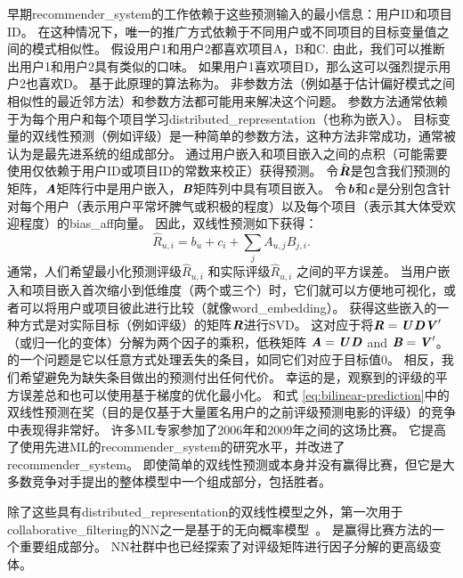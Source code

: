 早期\gls{recommender_system}的工作依赖于这些预测输入的最小信息：用户ID和项目ID。
在这种情况下，唯一的推广方式依赖于不同用户或不同项目的目标变量值之间的模式相似性。
假设用户1和用户2都喜欢项目A，B和C.
由此，我们可以推断出用户1和用户2具有类似的口味。
如果用户1喜欢项目D，那么这可以强烈提示用户2也喜欢D。
基于此原理的算法称为。
非参数方法（例如基于估计偏好模式之间相似性的最近邻方法）和参数方法都可能用来解决这个问题。
参数方法通常依赖于为每个用户和每个项目学习\gls{distributed_representation}（也称为嵌入）。
目标变量的双线性预测（例如评级）是一种简单的参数方法，这种方法非常成功，通常被认为是最先进系统的组成部分。
通过用户嵌入和项目嵌入之间的点积（可能需要使用仅依赖于用户ID或项目ID的常数来校正）获得预测。
令$\hat{\boldsymbol{\mathit{R}}}$是包含我们预测的矩阵，$\boldsymbol{\mathit{A}}$矩阵行中是用户嵌入，$\boldsymbol{\mathit{B}}$矩阵列中具有项目嵌入。
令$\boldsymbol{\mathit{b}}$和$\boldsymbol{\mathit{c}}$是分别包含针对每个用户（表示用户平常坏脾气或积极的程度）以及每个项目（表示其大体受欢迎程度）的\gls{bias_aff}向量。
因此，双线性预测如下获得：
\begin{equation}
\label{eq:bilinear-prediction}
 \hat{R}_{u,i} = b_u + c_i + \sum_j A_{u,j} B_{j,i}.
\end{equation}
通常，人们希望最小化预测评级$\hat{R}_{u,i}$ 和实际评级$\hat{R}_{u,i}$ 之间的平方误差。
当用户嵌入和项目嵌入首次缩小到低维度（两个或三个）时，它们就可以方便地可视化，或者可以将用户或项目彼此进行比较（就像\gls{word_embedding}）。
获得这些嵌入的一种方式是对实际目标（例如评级）的矩阵$\boldsymbol{\mathit{R}}$进行\gls{SVD}。
这对应于将$\boldsymbol{\mathit{R}} = \boldsymbol{\mathit{U}} \boldsymbol{\mathit{D}} \boldsymbol{\mathit{V}}'$（或归一化的变体）分解为两个因子的乘积，低秩矩阵 $\boldsymbol{\mathit{A}}=\boldsymbol{\mathit{U}} \boldsymbol{\mathit{D}}$ and $\boldsymbol{\mathit{B}} = \boldsymbol{\mathit{V}}'$。
的一个问题是它以任意方式处理丢失的条目，如同它们对应于目标值0。
相反，我们希望避免为缺失条目做出的预测付出任何代价。
幸运的是，观察到的评级的平方误差总和也可以使用基于梯度的优化最小化。
和式 \eqref{eq:bilinear-prediction}中的双线性预测在奖（目的是仅基于大量匿名用户的之前评级预测电影的评级）的竞争中表现得非常好\citep{bennett2007netflix}。
许多\gls{ML}专家参加了2006年和2009年之间的这场比赛。
它提高了使用先进\gls{ML}的\gls{recommender_system}的研究水平，并改进了\gls{recommender_system}。
即使简单的双线性预测或本身并没有赢得比赛，但它是大多数竞争对手提出的整体模型中一个组成部分，包括胜者\citep{BigChaos-Netflix2009,Koren09}。


除了这些具有\gls{distributed_representation}的双线性模型之外，第一次用于\gls{collaborative_filtering}的\gls{NN}之一是基于的无向概率模型~\citep{Salakhutdinov-2007-short}。
是赢得比赛方法的一个重要组成部分\citep{BigChaos-Netflix2009,Koren09}。
\gls{NN}社群中也已经探索了对评级矩阵进行因子分解的更高级变体\citep{Salakhutdinov2008-small}。

